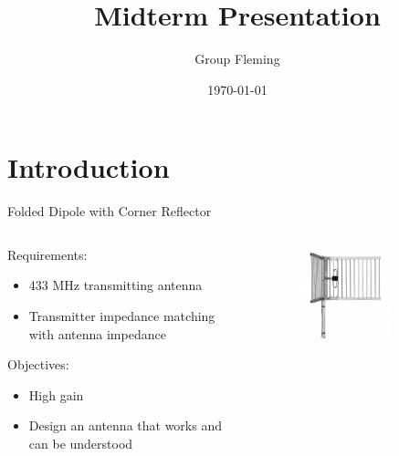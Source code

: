 \documentclass{beamer}
\title[]{Midterm Presentation} %
\author{Group Fleming} %
\institute[University of Twente] %
{
University of Twente \\ %
\medskip
}
\date{\today} %
\begin{document}
\begin{frame}
\titlepage %
\end{frame}

\section{Introduction}
\begin{frame}{Folded Dipole with Corner Reflector}
  \begin{columns}[T]
    \begin{column}{.5\textwidth}
     \begin{block}{Requirements:}
\begin{itemize} 
\item	433 MHz transmitting antenna 
\item	Transmitter impedance matching with antenna impedance
\end{itemize}
    \end{block}
    \begin{block}{Objectives:}
\begin{itemize}
\item High gain
\item Design an antenna that works and can be understood
\end{itemize}
\end{block}
    \end{column}
    \begin{column}{.5\textwidth}    
\begin{figure}
\includegraphics[width=0.7\textwidth]{picture.png}
\cite{figure_of_antenna}
\end{figure}    
    \end{column}
  \end{columns}
\end{frame}
\end{document}

